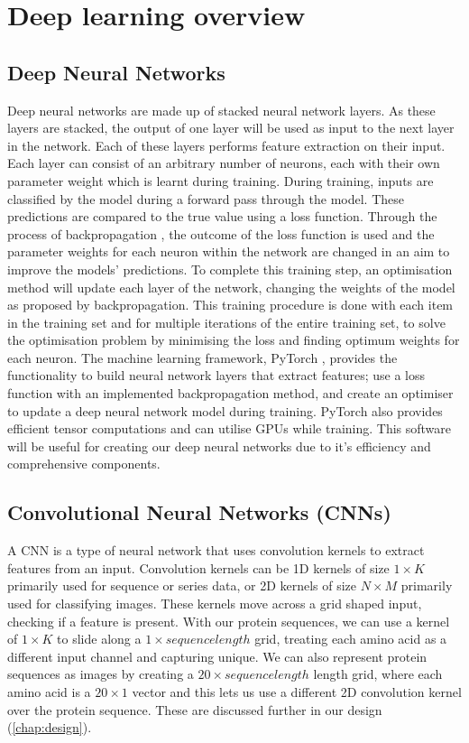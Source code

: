 \documentclass{l4proj}
\begin{document}
\section{Deep learning overview}

\subsection{Deep Neural Networks}

Deep neural networks are made up of stacked neural network layers. As these layers are stacked, the output of one layer will be used as input to the next layer in the network. Each of these layers performs feature extraction on their input. Each layer can consist of an arbitrary number of neurons, each with their own parameter weight which is learnt during training. During training, inputs are classified by the model during a forward pass through the model. These predictions are compared to the true value using a loss function. Through the process of backpropagation \citep{Goodfellow-et-al-2016}, the outcome of the loss function is used and the parameter weights for each neuron within the network are changed in an aim to improve the models' predictions. To complete this training step, an optimisation method will update each layer of the network, changing the weights of the model as proposed by backpropagation. This training procedure is done with each item in the training set and for multiple iterations of the entire training set, to solve the optimisation problem by minimising the loss and finding optimum weights for each neuron. The machine learning framework, PyTorch \citep{pytorch}, provides the functionality to build neural network layers that extract features; use a loss function with an implemented backpropagation method, and create an optimiser to update a deep neural network model during training. PyTorch also provides efficient tensor computations and can utilise GPUs while training. This software will be useful for creating our deep neural networks due to it's efficiency and comprehensive components.

\subsection{Convolutional Neural Networks (CNNs)}

A CNN is a type of neural network that uses convolution kernels to extract features from an input. Convolution kernels can be 1D kernels of size $1\times K$ primarily used for sequence or series data, or 2D kernels of size $N\times M$ primarily used for classifying images. These kernels move across a grid shaped input, checking if a feature is present. With our protein sequences, we can use a kernel of $1\times K$ to slide along a $1\times sequence length$ grid, treating each amino acid as a different input channel and capturing unique. We can also represent protein sequences as images by creating a $20\times sequence length$ length grid, where each amino acid is a $20\times 1$ vector and this lets us use a different 2D convolution kernel over the protein sequence. These are discussed further in our design (\ref{chap:design}). 
\end{document}
